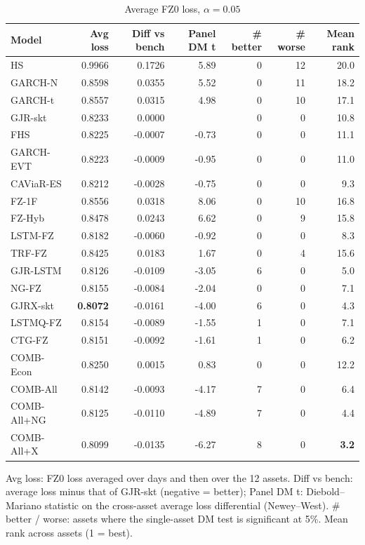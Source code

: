\begin{table}[htbp]
\centering
\footnotesize
\caption{Average FZ0 loss, $\alpha=0.05$}
\label{tab:loss_a050}
\begin{tabular}{lrrrrrr}
\toprule
Model & Avg loss & Diff vs bench & Panel DM t & \# better & \# worse & Mean rank \\
\midrule
HS & 0.9966 & 0.1726 & 5.89 & 0 & 12 & 20.0 \\
GARCH-N & 0.8598 & 0.0355 & 5.52 & 0 & 11 & 18.2 \\
GARCH-t & 0.8557 & 0.0315 & 4.98 & 0 & 10 & 17.1 \\
GJR-skt & 0.8233 & 0.0000 &  & 0 & 0 & 10.8 \\
FHS & 0.8225 & -0.0007 & -0.73 & 0 & 0 & 11.1 \\
GARCH-EVT & 0.8223 & -0.0009 & -0.95 & 0 & 0 & 11.0 \\
CAViaR-ES & 0.8212 & -0.0028 & -0.75 & 0 & 0 & 9.3 \\
FZ-1F & 0.8556 & 0.0318 & 8.06 & 0 & 10 & 16.8 \\
FZ-Hyb & 0.8478 & 0.0243 & 6.62 & 0 & 9 & 15.8 \\
LSTM-FZ & 0.8182 & -0.0060 & -0.92 & 0 & 0 & 8.3 \\
TRF-FZ & 0.8425 & 0.0183 & 1.67 & 0 & 4 & 15.6 \\
GJR-LSTM & 0.8126 & -0.0109 & -3.05 & 6 & 0 & 5.0 \\
NG-FZ & 0.8155 & -0.0084 & -2.04 & 0 & 0 & 7.1 \\
GJRX-skt & \textbf{0.8072} & -0.0161 & -4.00 & 6 & 0 & 4.3 \\
LSTMQ-FZ & 0.8154 & -0.0089 & -1.55 & 1 & 0 & 7.1 \\
CTG-FZ & 0.8151 & -0.0092 & -1.61 & 1 & 0 & 6.2 \\
COMB-Econ & 0.8250 & 0.0015 & 0.83 & 0 & 0 & 12.2 \\
COMB-All & 0.8142 & -0.0093 & -4.17 & 7 & 0 & 6.4 \\
COMB-All+NG & 0.8125 & -0.0110 & -4.89 & 7 & 0 & 4.4 \\
COMB-All+X & 0.8099 & -0.0135 & -6.27 & 8 & 0 & \textbf{3.2} \\
\bottomrule
\end{tabular}
\par\smallskip\parbox{\linewidth}{\scriptsize Avg loss: FZ0 loss averaged over days and then over the 12 assets. Diff vs bench: average loss minus that of GJR-skt (negative = better); Panel DM t: Diebold--Mariano statistic on the cross-asset average loss differential (Newey--West). \# better / worse: assets where the single-asset DM test is significant at 5\%. Mean rank across assets (1 = best).}
\end{table}